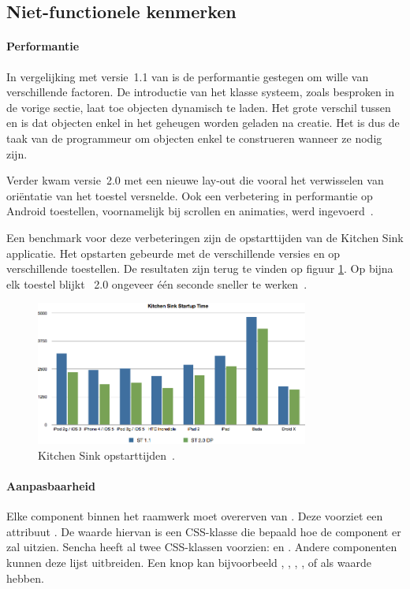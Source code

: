 
\subsection{Niet-functionele kenmerken}
\paragraph{Performantie}
In vergelijking met versie~1.1 van \st{} is de performantie gestegen om wille van verschillende factoren.  
De introductie van het klasse systeem,  zoals besproken in de vorige sectie,  laat toe objecten dynamisch te laden. 
Het grote verschil tussen  en  is dat objecten enkel in het geheugen worden geladen na creatie.  
Het is dus de taak van de programmeur om objecten enkel te construeren wanneer ze nodig zijn.

Verder kwam versie~2.0 met een nieuwe lay-out  die vooral het verwisselen van oriëntatie van het toestel versnelde.  
Ook een verbetering in performantie op Android toestellen,  voornamelijk bij scrollen en animaties,  werd ingevoerd~\cite{Inc.}.

Een benchmark voor deze verbeteringen zijn de opstarttijden van de Kitchen Sink applicatie.  
Het opstarten gebeurde met de verschillende \st{} versies en op verschillende toestellen.  
De resultaten zijn terug te vinden op figuur \ref{fig:sencha_performance}.  
Op bijna elk toestel blijkt \st{}~2.0 ongeveer één seconde sneller te werken~\cite{SenchaInc.2013}.

\begin{figure}
  \centering
  \includegraphics[width=0.8\textwidth]{figuren/sencha-touch-startup-times.png}
  \caption{\st{} Kitchen Sink opstarttijden~\cite{SenchaInc.2013}.}
  \label{fig:sencha_performance}
\end{figure}

\paragraph{Aanpasbaarheid}
\label{sec:sencha-aanpasbaarheid}
Elke component binnen het raamwerk moet overerven van .  
Deze voorziet een attribuut .  
De waarde hiervan is een CSS-klasse die bepaald hoe de component er zal uitzien.  
Sencha heeft al twee CSS-klassen voorzien:   en .  
Andere componenten kunnen deze lijst uitbreiden.  
Een knop kan bijvoorbeeld ,  ,  ,  ,   of  als  waarde hebben.

